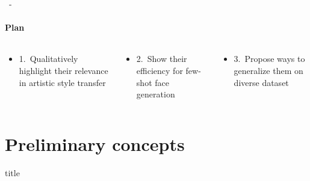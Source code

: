 \documentclass[aspectratio=169, 22pt]{beamer}
\begin{document}
\begin{frame}{\secname~- \subsecname}
  \framesubtitle{Plan}
  \begin{columns}
    \begin{column}{0.3\linewidth}
      \begin{itemize}
        \centering
        \item \small 1. \alert{Qualitatively} highlight their relevance in artistic style transfer
      \end{itemize}
    \end{column}
    \begin{column}{0.3\linewidth}
      \begin{itemize}
        \centering
      \item \small 2. Show their \alert{efficiency} for few-shot face generation
      \end{itemize}      
    \end{column}
    \begin{column}{0.3\linewidth}
      \begin{itemize}
        \centering
      \item \small 3. Propose ways to \alert{generalize} them on diverse dataset
      \end{itemize}      
    \end{column}
  \end{columns}
\end{frame}


\section{Preliminary concepts}
\begin{frame}
  \begin{beamercolorbox}[sep=15pt,center,shadow=true,rounded=true]{title}
    \LARGE\bfseries \secname
  \end{beamercolorbox}
\end{frame}
\end{document}
